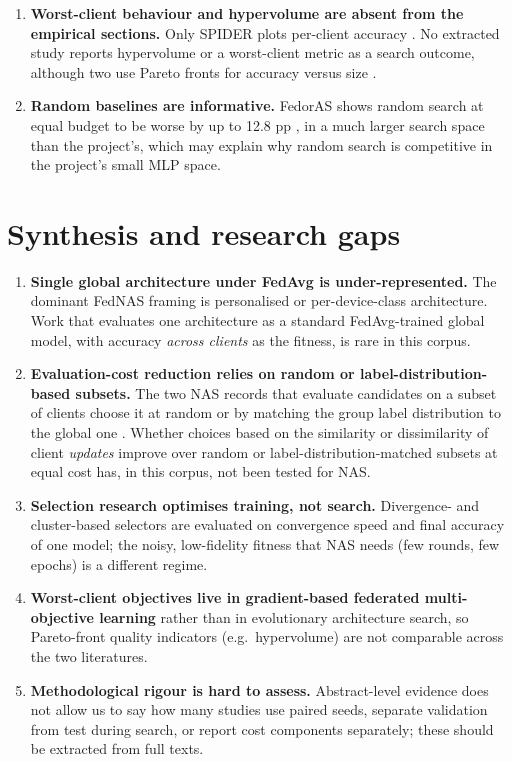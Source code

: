 \documentclass[11pt,a4paper]{article}
\begin{document}
\begin{enumerate}
\item \textbf{Worst-client behaviour and hypervolume are absent from the empirical sections.} Only SPIDER plots per-client accuracy \cite{mushtaq2021spider}. No extracted study reports hypervolume or a worst-client metric as a search outcome, although two use Pareto fronts for accuracy versus size \cite{zhu2021realtime,dudziak2022fedoras}.
\item \textbf{Random baselines are informative.} FedorAS shows random search at equal budget to be worse by up to 12.8 pp \cite{dudziak2022fedoras}, in a much larger search space than the project's, which may explain why random search is competitive in the project's small MLP space.
\end{enumerate}

\section{Synthesis and research gaps}\label{sec:synthesis}
\begin{enumerate}
\item \textbf{Single global architecture under FedAvg is under-represented.} The dominant FedNAS framing is personalised or per-device-class architecture. Work that evaluates one architecture as a standard FedAvg-trained global model, with accuracy \emph{across clients} as the fitness, is rare in this corpus.
\item \textbf{Evaluation-cost reduction relies on random or label-distribution-based subsets.} The two NAS records that evaluate candidates on a subset of clients choose it at random \cite{zhu2021realtime} or by matching the group label distribution to the global one \cite{yuan2022resourceaware}. Whether choices based on the similarity or dissimilarity of client \emph{updates} improve over random or label-distribution-matched subsets at equal cost has, in this corpus, not been tested for NAS.
\item \textbf{Selection research optimises training, not search.} Divergence- and cluster-based selectors are evaluated on convergence speed and final accuracy of one model; the noisy, low-fidelity fitness that NAS needs (few rounds, few epochs) is a different regime.
\item \textbf{Worst-client objectives live in gradient-based federated multi-objective learning} rather than in evolutionary architecture search, so Pareto-front quality indicators (e.g.\ hypervolume) are not comparable across the two literatures.
\item \textbf{Methodological rigour is hard to assess.} Abstract-level evidence does not allow us to say how many studies use paired seeds, separate validation from test during search, or report cost components separately; these should be extracted from full texts.
\end{enumerate}
\end{document}
